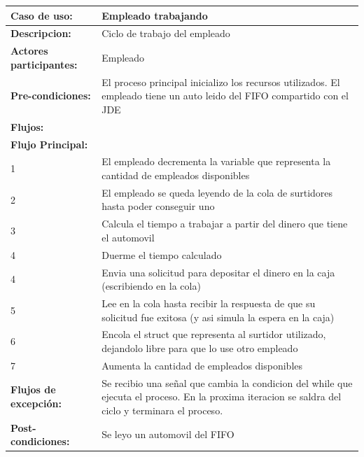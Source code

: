 \documentclass[12pt,a4paper,spanish]{article}
\begin{document}
	\begin{tabular}{|p{4cm}|p{12cm}|}
    \hline
    \textbf{Caso de uso:} & Empleado trabajando \\
    \hline
    \textbf{Descripcion:} &  Ciclo de trabajo del empleado\\
    \hline
    \textbf{Actores participantes:} & Empleado\\
    \hline
 
    \textbf{Pre-condiciones:} &  El proceso principal inicializo los recursos utilizados. El empleado tiene un auto leido del FIFO compartido con el JDE\\
    \hline
    \hline
    \textbf{Flujos:} &\\
    \hline
	\textbf{Flujo Principal:} &\\ 

	\hline
	1 & El empleado decrementa la variable que representa la cantidad de empleados disponibles\\
	\hline
	2 & El empleado se queda leyendo de la cola de surtidores hasta poder conseguir uno\\
	\hline
	3 & Calcula el tiempo a trabajar a partir del dinero que tiene el automovil\\
	\hline
	4 & Duerme el tiempo calculado\\
	\hline
	4 & Envia una solicitud para depositar el dinero en la caja (escribiendo en la cola) \\
	\hline
	5 & Lee en la cola hasta recibir la respuesta de que su solicitud fue exitosa (y asi simula la espera en la caja)\\
	\hline
	6 & Encola el struct que representa al surtidor utilizado, dejandolo libre para que lo use otro empleado\\
	\hline
	7 & Aumenta la cantidad de empleados disponibles\\
	\hline
	\hline
	\textbf{Flujos de excepción:} & Se recibio una señal que cambia la condicion del while que ejecuta el proceso. En la proxima iteracion se saldra del ciclo y terminara el proceso.\\
    \hline

    \hline
	\textbf{Post-condiciones:} & Se leyo un automovil del FIFO\\
	\hline
	\end{tabular}

	\newpage
\end{document}
